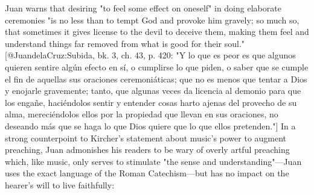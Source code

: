 Juan warns that desiring "to feel some effect on oneself" in doing elaborate
ceremonies "is no less than to tempt God and provoke him gravely; so much so,
that sometimes it gives license to the devil to deceive them, making them feel
and understand things far removed from what is good for their soul."
[@JuandelaCruz:Subida, bk. 3, ch. 43, p. 420: 
"Y lo que es peor es que algunos quieren sentire algún efecto en sí, o cumplirse
lo que piden, o saber que se cumple el fin de aquellas sus oraciones
ceremoniáticas; que no es menos que tentar a Dios y enojarle gravemente; tanto,
que algunas veces da licencia al demonio para que los engañe, haciéndolos sentir
y entender cosas harto ajenas del provecho de su alma, mereciéndolos ellos por
la propiedad que llevan en sus oraciones, no deseando más que se haga lo que
Dios quiere que lo que ellos pretenden."]
In a strong counterpoint to Kircher's statement about music's power to augment
preaching, Juan admonishes his readers to be wary of overly artful preaching
which, like music, only serves to stimulate "the sense and understanding"---Juan
uses the exact language of the Roman Catechism---but has no impact on the
hearer's will to live faithfully:

